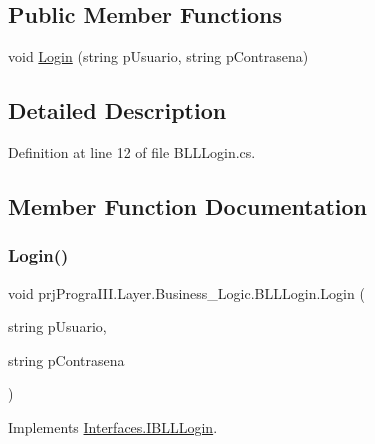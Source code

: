 \subsection*{Public Member Functions}
\begin{DoxyCompactItemize}
\item 
void \hyperlink{classprj_progra_i_i_i_1_1_layer_1_1_business___logic_1_1_b_l_l_login_a1ce2aab6695b99e4befd53e315168ade}{Login} (string p\+Usuario, string p\+Contrasena)
\end{DoxyCompactItemize}


\subsection{Detailed Description}


Definition at line 12 of file B\+L\+L\+Login.\+cs.



\subsection{Member Function Documentation}
\hypertarget{classprj_progra_i_i_i_1_1_layer_1_1_business___logic_1_1_b_l_l_login_a1ce2aab6695b99e4befd53e315168ade}{}\label{classprj_progra_i_i_i_1_1_layer_1_1_business___logic_1_1_b_l_l_login_a1ce2aab6695b99e4befd53e315168ade} 
\subsubsection{\texorpdfstring{Login()}{Login()}}
{\footnotesize\ttfamily void prj\+Progra\+I\+I\+I.\+Layer.\+Business\+\_\+\+Logic.\+B\+L\+L\+Login.\+Login (\begin{DoxyParamCaption}\item[{string}]{p\+Usuario,  }\item[{string}]{p\+Contrasena }\end{DoxyParamCaption})}



Implements \hyperlink{interface_interfaces_1_1_i_b_l_l_login_a809da754cba4a38c15fd18a7bd9cb95a}{Interfaces.\+I\+B\+L\+L\+Login}.



